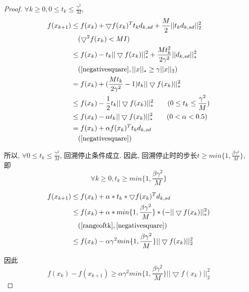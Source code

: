 \documentclass[UTF8]{ctexart}
\theoremstyle{Defination}
\theoremstyle{remark}
\begin{document}
\begin{proof}

$\forall k\geq0, 0\leq t_k\leq\frac{\gamma^2}{M}$, 
\begin{equation}
\begin{aligned}
f(x_{k+1}) & \leq f(x_k)+\bigtriangledown f(x_k)^Tt_kd_{k,sd}+\frac{M}{2}||t_kd_{k,sd}||_2^2 \\
 & \quad(\bigtriangledown^2f(x_k)<MI) \\
 & \leq f(x_k)-t_k||\bigtriangledown f(x_k)||_*^2+\frac{Mt_k^2}{2\gamma^2}||d_{k,sd}||_*^2 \\
 & \quad(\autoref{negativesquare}, ||x||_*\geq\gamma||x||_2) \\
 & =f(x_k)+(\frac{Mt_k}{2\gamma^2}-1)t_k||\bigtriangledown f(x_k)||_*^2 \\
 & \leq f(x_k)-\frac{1}{2}t_k||\bigtriangledown f(x_k)||_*^2\qquad(0\leq t_k\leq\frac{\gamma^2}{M}) \\
 & \leq f(x_k)-\alpha t_k||\bigtriangledown f(x_k)||_*^2\qquad(0<\alpha<0.5) \\
 & =f(x_k)+\alpha f(x_k)^Tt_kd_{k,sd} \\
 & \quad(\autoref{negativesquare})
\end{aligned}
\end{equation}

所以, $\forall0\leq t_k\leq\frac{\gamma^2}{M}$, 回溯停止条件成立. 因此, 回溯停止时的步长$t\geq min\{1,\frac{\beta\gamma^2}{M}\}$, 即
\begin{equation}
\label{rangeoftk}
\forall k\geq0, t_k\geq min\{1,\frac{\beta\gamma^2}{M}\}
\end{equation}

\begin{equation}
\begin{aligned}
f(x_{k+1}) & \leq f(x_k)+\alpha*t_k*\bigtriangledown f(x_k)^Td_{k, sd} \\
 & \leq f(x_k)+\alpha*min\{1,\frac{\beta\gamma^2}{M}\}*(-||\bigtriangledown f(x_k)||_*^2) \\
 & \quad(\autoref{rangeoftk}, \autoref{negativesquare}) \\
 & \leq f(x_k)-\alpha\gamma^2min\{1,\frac{\beta\gamma^2}{M}\}||\bigtriangledown f(x_k)||_2^2 \\
\end{aligned}
\end{equation}

因此
\begin{equation}
\label{inexactstep}
f(x_k)-f(x_{k+1})\geq\alpha\gamma^2min\{1,\frac{\beta\gamma^2}{M}\}||\bigtriangledown f(x_k)||_2^2
\end{equation}



\end{proof}
\end{document}
